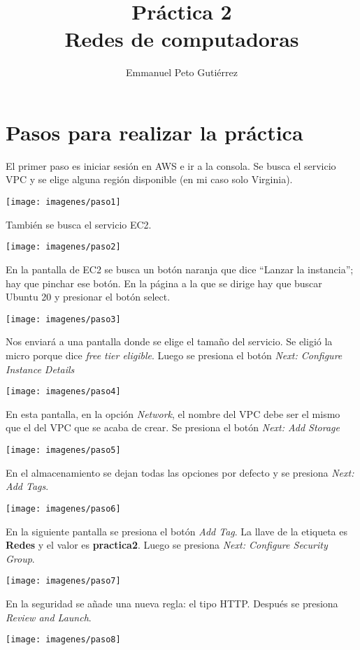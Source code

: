 \documentclass{article}
\title{Práctica 2\\Redes de computadoras}
\author{Emmanuel Peto Gutiérrez}
\begin{document}
\maketitle

\section{Pasos para realizar la práctica}

El primer paso es iniciar sesión en AWS e ir a la consola. Se busca el servicio VPC y se elige alguna región disponible (en mi caso solo Virginia).

\texttt{[image: imagenes/paso1]}

También se busca el servicio EC2.

\texttt{[image: imagenes/paso2]}

En la pantalla de EC2 se busca un botón naranja que dice ``Lanzar la instancia''; hay que pinchar ese botón. En la página a la que se dirige hay que buscar Ubuntu 20 y presionar el botón select.

\texttt{[image: imagenes/paso3]}

Nos enviará a una pantalla donde se elige el tamaño del servicio. Se eligió la micro porque dice \textit{free tier eligible}. Luego se presiona el botón \textit{Next: Configure Instance Details}

\texttt{[image: imagenes/paso4]}

En esta pantalla, en la opción \textit{Network}, el nombre del VPC debe ser el mismo que el del VPC que se acaba de crear. Se presiona el botón \textit{Next: Add Storage}

\texttt{[image: imagenes/paso5]}

En el almacenamiento se dejan todas las opciones por defecto y se presiona \textit{Next: Add Tags}.

\texttt{[image: imagenes/paso6]}

En la siguiente pantalla se presiona el botón \textit{Add Tag}. La llave de la etiqueta es \textbf{Redes} y el valor es \textbf{practica2}. Luego se presiona \textit{Next: Configure Security Group}.

\texttt{[image: imagenes/paso7]}

En la seguridad se añade una nueva regla: el tipo HTTP. Después se presiona \textit{Review and Launch}.

\texttt{[image: imagenes/paso8]}
\end{document}
